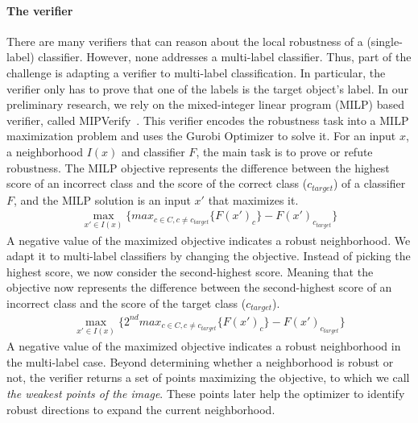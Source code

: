     \paragraph{The verifier}
    There are many verifiers that can reason about the local robustness of a (single-label) classifier.
    However, none addresses a multi-label classifier.
    Thus, part of the challenge is adapting a verifier to multi-label classification.
    In particular, the verifier only has to prove that one of the labels is the target object's label. %
    In our preliminary research, we rely on the mixed-integer linear program (MILP) based verifier, called MIPVerify~\cite{MIPVERIFY}.
    This verifier encodes the robustness task into a MILP maximization problem and uses the Gurobi Optimizer to solve it.
    For an input $x$, a neighborhood $I(x)$ and classifier $F$, the main task is to prove or refute robustness.
    The MILP objective represents the difference between the highest score of an incorrect class and the score of the correct class ($c_{target}$) of a classifier $F$, and the MILP solution is an input $x'$ that maximizes it.
    \begin{gather*}
        \max_{x' \in I(x)}\{max_{c \in C, c \neq c_{target}}\{F(x')_c\} - F(x')_{c_{target}}\}
    \end{gather*}
    A negative value of the maximized objective indicates a robust neighborhood.
    We adapt it to multi-label classifiers by changing the objective.
    Instead of picking the highest score, we now consider the second-highest score.
    Meaning that the objective now represents the difference between the second-highest score of an incorrect class and the score of the target class ($c_{target}$).
    \begin{gather*}
        \max_{x' \in I(x)}\{2^{nd}max_{c \in C, c \neq c_{target}}\{F(x')_c\} - F(x')_{c_{target}}\}
    \end{gather*}
    A negative value of the maximized objective indicates a robust neighborhood in the multi-label case.
    Beyond determining whether a neighborhood is robust or not, the verifier returns a set of points maximizing the objective, to which we call \emph{the weakest points of the image}.
    These points later help the optimizer to identify robust directions to expand the current neighborhood.
    
